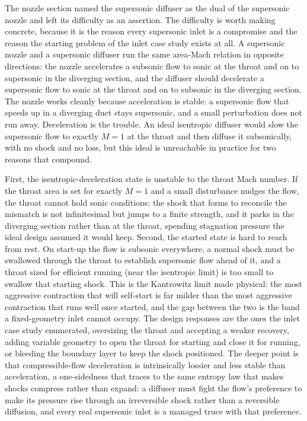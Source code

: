 The nozzle section named the supersonic diffuser as the dual of the
supersonic nozzle and left its difficulty as an assertion. The
difficulty is worth making concrete, because it is the reason every
supersonic inlet is a compromise and the reason the starting problem of
the inlet case study exists at all. A supersonic nozzle and a supersonic
diffuser run the same area-Mach relation in opposite directions: the
nozzle accelerates a subsonic flow to sonic at the throat and on to
supersonic in the diverging section, and the diffuser should decelerate
a supersonic flow to sonic at the throat and on to subsonic in the
diverging section. The nozzle works cleanly because acceleration is
stable: a supersonic flow that speeds up in a diverging duct stays
supersonic, and a small perturbation does not run away. Deceleration is
the trouble. An ideal isentropic diffuser would slow the supersonic flow
to exactly $M = 1$ at the throat and then diffuse it subsonically, with
no shock and no loss, but this ideal is unreachable in practice for two
reasons that compound.

First, the isentropic-deceleration state is unstable to the throat Mach
number. If the throat area is set for exactly $M = 1$ and a small
disturbance nudges the flow, the throat cannot hold sonic conditions:
the shock that forms to reconcile the mismatch is not infinitesimal but
jumps to a finite strength, and it parks in the diverging section rather
than at the throat, spending stagnation pressure the ideal design
assumed it would keep. Second, the started state is hard to reach from
rest. On start-up the flow is subsonic everywhere, a normal shock must
be swallowed through the throat to establish supersonic flow ahead of
it, and a throat sized for efficient running (near the isentropic limit)
is too small to swallow that starting shock. This is the Kantrowitz
limit made physical: the most aggressive contraction that will
self-start is far milder than the most aggressive contraction that runs
well once started, and the gap between the two is the band a
fixed-geometry inlet cannot occupy. The design responses are the ones
the inlet case study enumerated, oversizing the throat and accepting a
weaker recovery, adding variable geometry to open the throat for
starting and close it for running, or bleeding the boundary layer to
keep the shock positioned. The deeper point is that compressible-flow
deceleration is intrinsically lossier and less stable than acceleration,
a one-sidedness that traces to the same entropy law that makes shocks
compress rather than expand: a diffuser must fight the flow's preference
to make its pressure rise through an irreversible shock rather than a
reversible diffusion, and every real supersonic inlet is a managed
truce with that preference.

